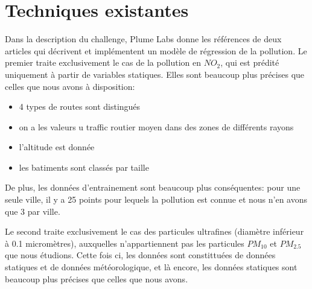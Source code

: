 \section{Techniques existantes}

Dans la description du challenge, Plume Labs donne les références de deux articles qui décrivent et implémentent un modèle de régression de la pollution.
Le premier \cite{} traite exclusivement le cas de la pollution en $NO_2$, qui est prédité uniquement à partir de variables statiques.
Elles sont beaucoup plus précises que celles que nous avons à disposition:
\begin{itemize}
  \item 4 types de routes sont distingués
  \item on a les valeurs u traffic routier moyen dans des zones de différents rayons
  \item l'altitude est donnée
  \item les batiments sont classés par taille
\end{itemize}

De plus, les données d'entrainement sont beaucoup plus conséquentes: pour une seule ville, il y a 25 points pour lequels la pollution est connue et nous n'en avons que 3 par ville.

Le second \cite{} traite exclusivement le cas des particules ultrafines (diamètre inférieur à 0.1 micromètres), auxquelles n'appartiennent pas les particules $PM_{10}$ et $PM_{2.5}$ que nous étudions.
Cette fois ci, les données sont constittuées de données statiques et de données météorologique, et là encore, les données statiques sont beaucoup plus précises que celles que nous avons.
